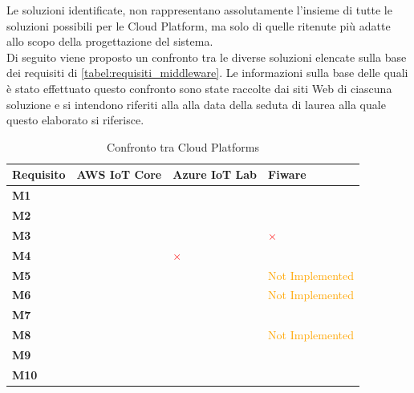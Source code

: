 Le soluzioni identificate, non rappresentano assolutamente l'insieme di tutte le soluzioni possibili per le Cloud Platform, ma solo di quelle ritenute più adatte allo scopo della progettazione del sistema.\\
Di seguito viene proposto un confronto tra le diverse soluzioni elencate sulla base dei requisiti di \autoref{tabel:requisiti_middleware}. Le informazioni sulla base delle quali è stato effettuato questo confronto sono state raccolte dai siti Web di ciascuna soluzione e si intendono riferiti alla alla data della seduta di laurea alla quale questo elaborato si riferisce.\\
\begin{table}
	\centering
	\begin{tabular}{|>{\centering\arraybackslash}m{2.5cm}|>{\centering\arraybackslash}m{4cm}|>{\centering\arraybackslash}m{4cm}|>{\centering\arraybackslash}m{4cm}|}
		\hline
		\textbf{Requisito} & \textbf{AWS IoT Core} & \textbf{Azure IoT Lab} & \textbf{Fiware} \\
		\hline
		\textbf{M1} &  \textcolor{green}{\checkmark} &   \textcolor{green}{\checkmark} &   \textcolor{green}{\checkmark} \\
		\hline
		\textbf{M2} &  \textcolor{green}{\checkmark} &   \textcolor{green}{\checkmark} &   \textcolor{green}{\checkmark} \\
		\hline
		\textbf{M3} &  \textcolor{green}{\checkmark} &   \textcolor{green}{\checkmark} &   \textcolor{red}{$\times$} \\
		\hline
		\textbf{M4} &  \textcolor{green}{\checkmark} &   \textcolor{red}{$\times$} &   \textcolor{green}{\checkmark} \\
		\hline
		\textbf{M5} &  \textcolor{green}{\checkmark} &   \textcolor{green}{\checkmark} &   \textcolor{orange}{Not Implemented} \\
		\hline
		\textbf{M6} &  \textcolor{green}{\checkmark} &   \textcolor{green}{\checkmark} &   \textcolor{orange}{Not Implemented} \\
		\hline
		\textbf{M7} &  \textcolor{green}{\checkmark} &   \textcolor{green}{\checkmark} &   \textcolor{green}{\checkmark} \\
		\hline
		\textbf{M8} &  \textcolor{green}{\checkmark} &   \textcolor{green}{\checkmark} &   \textcolor{orange}{Not Implemented} \\
		\hline
		\textbf{M9} &  \textcolor{green}{\checkmark} &   \textcolor{green}{\checkmark} &   \textcolor{green}{\checkmark} \\
		\hline
		\textbf{M10} &  \textcolor{green}{\checkmark} &   \textcolor{green}{\checkmark} &   \textcolor{green}{\checkmark} \\
		\hline
	\end{tabular}	
	\caption{Confronto tra Cloud Platforms}
	\label{tabel:platform_comparison}
\end{table}
